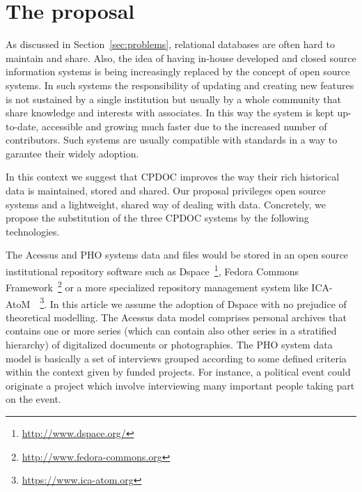\section{The proposal}\label{sec:proposal}

As discussed in Section~\ref{sec:problems}, relational databases are
often hard to maintain and share. Also, the idea of having in-house
developed and closed source information systems is being increasingly
replaced by the concept of open source systems. In such systems the
responsibility of updating and creating new features is not sustained
by a single institution but usually by a whole community that share
knowledge and interests with associates. In this way the system is
kept up-to-date, accessible and growing much faster due to the
increased number of contributors. Such systems are usually compatible
with standards in a way to garantee their widely adoption.

In this context we suggest that CPDOC improves the way their rich
historical data is maintained, stored and shared. Our proposal
privileges open source systems and a lightweight, shared way of
dealing with data. Concretely, we propose the substitution of the
three CPDOC systems by the following technologies.


The Acessus and PHO systems data and files would be stored in an open
source institutional repository software such as
Dspace~\footnote{\url{http://www.dspace.org/}}, Fedora Commons
Framework~\footnote{\url{http://www.fedora-commons.org}} or a more
specialized repository management system like
ICA-AtoM~\cite{van2009ica}~\footnote{\url{https://www.ica-atom.org}}. In
this article we assume the adoption of Dspace with no prejudice of
theoretical modelling. The Acessus data model comprises personal
archives that contains one or more series (which can contain also
other series in a stratified hierarchy) of digitalized documents or
photographies. The PHO system data model is basically a set of
interviews grouped according to some defined criteria within the
context given by funded projects. For instance, a political event
could originate a project which involve interviewing many important
people taking part on the event.

